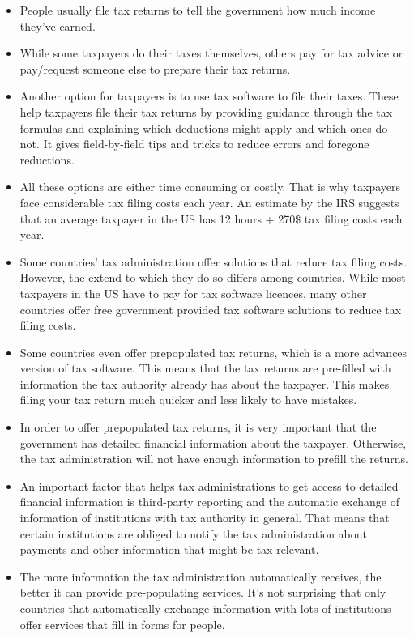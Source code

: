 \documentclass[12pt]{article}
\begin{document}
\begin{itemize}
    \item People usually file tax returns to tell the government how much income they've earned.
    \item While some taxpayers do their taxes themselves, others pay for tax advice or pay/request someone else to prepare their tax returns. 
    \item Another option for taxpayers is to use tax software to file their taxes. These help taxpayers file their tax returns by providing guidance through the tax formulas and explaining which deductions might apply and which ones do not.  It gives field-by-field tips and tricks to reduce errors and foregone reductions.
    \item All these options are either time consuming or costly. That is why taxpayers face considerable tax filing costs each year. An estimate by the IRS suggests that an average taxpayer in the US has 12 hours + 270\$ tax filing costs each year.
    \item Some countries' tax administration offer solutions that reduce tax filing costs. However, the extend to which they do so differs among countries. While most taxpayers in the US have to pay for tax software licences, many other countries offer free government provided tax software solutions to reduce tax filing costs. 
    \item Some countries even offer prepopulated tax returns, which is a more advances version of tax software. This means that the tax returns are pre-filled with information the tax authority already has about the taxpayer. This makes filing your tax return much quicker and less likely to have mistakes. 
    \item In order to offer prepopulated tax returns, it is very important that the government has detailed financial information about the taxpayer. Otherwise, the tax administration will not have enough information to prefill the returns.
    \item An important factor that helps tax administrations to get access to detailed financial information is third-party reporting and the automatic exchange of information of institutions with tax authority in general. That means that certain institutions are obliged to notify the tax administration about payments and other information that might be tax relevant. 
    \item The more information the tax administration automatically receives, the better it can provide pre-populating services. It's not surprising that only countries that automatically exchange information with lots of institutions offer services that fill in forms for people.

\end{itemize}
\end{document}
